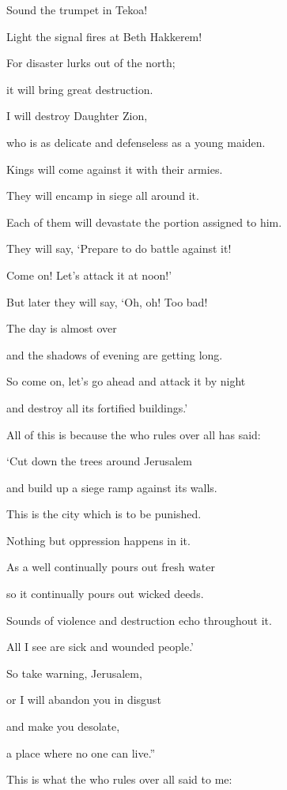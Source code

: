 {\par }{\Q Sound
the trumpet
in
Tekoa!
\par }{\Q Light
the signal fires
at Beth Hakkerem!
\par }{\Q For
disaster
lurks out
of the north;
\par }{\Q it will bring great
destruction.
\par }{\Q {}I will destroy
Daughter
Zion,
\par }{\Q who is as delicate
and defenseless as
a young
maiden.
\par }{\Q {}Kings will come
against
it with their armies.

\par }{\Q They will encamp in siege all around
it.

\par }{\Q Each of them will devastate the portion assigned to him.
\par }{\Q {}They will say, ‘Prepare
to do battle
against it!
\par }{\Q Come on! Let’s
attack
it at noon!’
\par }{\Q But
later they will say, ‘Oh, oh! Too bad!

\par }{\Q The day
is almost
over
\par }{\Q and the shadows
of evening
are getting long.
\par }{\Q {}So come
on, let’s
go
ahead and attack
it by night
\par }{\Q and destroy
all its fortified buildings.’
\par }{\Q {}All
of this is because
the {}
who rules over all
has said:
\par }{\Q ‘Cut
down the trees
around Jerusalem
\par }{\Q and build up a siege
ramp
against its walls.

\par }{\Q This is
the city
which is to be punished.
\par }{\Q Nothing but oppression
happens in it.
\par }{\Q {}As a well
continually pours out
fresh water
\par }{\Q so
it continually pours out
wicked
deeds.

\par }{\Q Sounds of violence
and destruction
echo
throughout it.

\par }{\Q All I see are sick
and wounded people.’
\par }{\Q {}So take warning,
Jerusalem,
\par }{\Q or
I will abandon you in disgust
\par }{\Q and make you
desolate,
\par }{\Q a place
where no
one can live.”
\par }{\PP {}This is what
the {}
who rules over all
said
to me:

}
